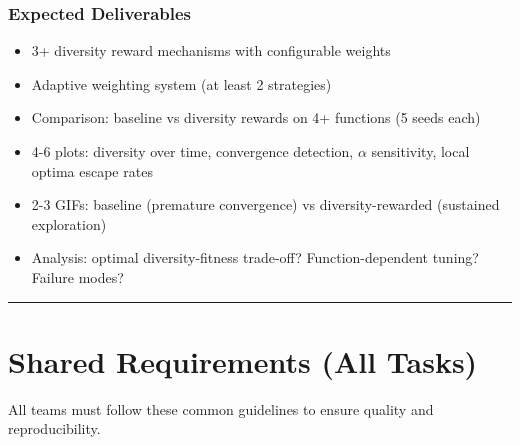 \documentclass[11pt,a4paper]{scrartcl}
\newcommand{\sectiondivider}{%
  \vspace{0.2em}%
  \noindent\textcolor{rulecolor}{\rule{0.3\textwidth}{0.4pt}}%
  \vspace{0.3em}%
}
\begin{document}
\subsubsection*{Expected Deliverables}
\begin{itemize}
    \item 3+ diversity reward mechanisms with configurable weights
    \item Adaptive weighting system (at least 2 strategies)
    \item Comparison: baseline vs diversity rewards on 4+ functions (5 seeds each)
    \item 4-6 plots: diversity over time, convergence detection, $\alpha$ sensitivity, local optima escape rates
    \item 2-3 GIFs: baseline (premature convergence) vs diversity-rewarded (sustained exploration)
    \item Analysis: optimal diversity-fitness trade-off? Function-dependent tuning? Failure modes?
\end{itemize}

\sectiondivider

\section*{Shared Requirements (All Tasks)}

All teams must follow these common guidelines to ensure quality and reproducibility.
\end{document}
